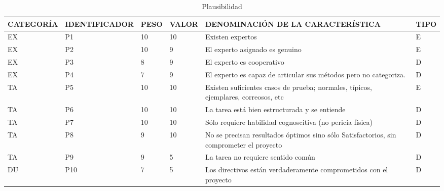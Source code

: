 \documentclass[a4paper,12pt]{article}
\begin{document}
\begin{table}[h]
	\centering
	\begin{tabular}{|l|l|l|l|p{4cm}|l|}
		\hline
		\scriptsize CATEGORÍA & \scriptsize IDENTIFICADOR & \scriptsize PESO & \scriptsize VALOR & \scriptsize DENOMINACIÓN DE LA CARACTERÍSTICA                                           & \scriptsize TIPO \\ \hline
		EX                    & P1                        & 10               & 10                & Existen expertos                                                                        & E                \\ \hline
		EX                    & P2                        & 10               & 9                 & El experto asignado es genuino                                                          & E                \\ \hline
		EX                    & P3                        & 8                & 9                 & El experto es cooperativo                                                               & D                \\ \hline
		EX                    & P4                        & 7                & 9                 & El experto es capaz de articular sus métodos pero no categoriza.                        & D                \\ \hline
		TA                    & P5                        & 10               & 10                & Existen suficientes casos de prueba; normales, típicos, ejemplares, correosos, etc      & E                \\ \hline
		TA                    & P6                        & 10               & 10                & La tarea está bien estructurada y se entiende                                           & D                \\ \hline
		TA                    & P7                        & 10               & 10                & Sólo requiere habilidad cognoscitiva (no pericia física)                                & D                \\ \hline
		TA                    & P8                        & 9                & 10                & No se precisan resultados óptimos sino sólo Satisfactorios, sin comprometer el proyecto & D                \\ \hline
		TA                    & P9                        & 9                & 5                 & La tarea no requiere sentido común                                                      & D                \\ \hline
		DU                    & P10                       & 7                & 5                 & Los directivos están verdaderamente comprometidos con el proyecto                       & D \\ \hline
	\end{tabular}
	\caption{Plausibilidad}
	\label{tab:plausibilidad}
\end{table}
\end{document}
